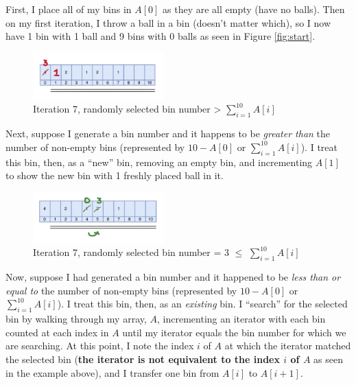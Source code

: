 \documentclass[conference]{styles/acmsiggraph}
\newcommand{\?}{\stackrel{?}{=}}
\begin{document}
First, I place all of my bins in $A[0]$ as they are all empty (have no balls).  Then on my first iteration, I throw a ball in a bin (doesn't matter which), so I now have 1 bin with 1 ball and 9 bins with 0 balls as seen in Figure \ref{fig:start}.

\begin{figure}[h!]
    \centering
    \includegraphics[width=0.45\textwidth]{Problem5.1Figures/scenario2.png}
    \caption{Iteration 7, randomly selected bin number > $\sum_{i=1}^{10} A[i]$}
    \label{fig:scenario1}
\end{figure}
\FloatBarrier

Next, suppose I generate a bin number and it happens to be \textit{greater than} the number of non-empty bins (represented by $10 - A[0]$ or $\sum_{i=1}^{10} A[i]$).  I treat this bin, then, as a \enquote{new} bin, removing an empty bin, and incrementing $A[1]$ to show the new bin with 1 freshly placed ball in it.


\begin{figure}[h!]
    \centering
    \includegraphics[width=0.45\textwidth]{Problem5.1Figures/scenario1.png}
    \caption{Iteration 7, randomly selected bin number = 3 $\leq$ $\sum_{i=1}^{10} A[i]$}
    \label{fig:scenario2}
\end{figure}
\FloatBarrier

Now, suppose I had generated a bin number and it happened to be \textit{less than or equal to} the number of non-empty bins (represented by $10 - A[0]$ or $\sum_{i=1}^{10} A[i]$).  I treat this bin, then, as an \textit{existing} bin.  I \enquote{search} for the selected bin by walking through my array, $A$, incrementing an iterator with each bin counted at each index in $A$ until my iterator equals the bin number for which we are searching.  At this point, I note the index $i$ of $A$ at which the iterator matched the selected bin (\textbf{the iterator is not equivalent to the index $i$ of $A$} as seen in the example above), and I transfer one bin from $A[i]$ to $A[i+1]$. \\
\end{document}
